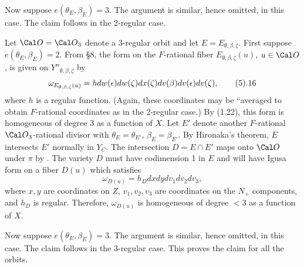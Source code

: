 Now suppose $e(\theta_E,\beta_E)=3$. The argument is similar,
hence omitted, in this case. The claim follows in the
2-regular case.

Let ${\Cal O}={\Cal O}_3$ denote a 3-regular orbit and let 
$E=E_{\emptyset, \beta,\zeta}$. 
First suppose $e(\theta_E,\beta_E)=2$.
From \S 8, the form on the $F$-rational fiber
$E_{\emptyset,\beta,\zeta}(u)$, $u\in {\Cal O}$, is given 
on $Y''_{\emptyset,\beta,\zeta}$ by
$$
\omega_{E_{\emptyset,\beta,\zeta}(u)}
=h dw(\epsilon)dw(\zeta)dx(\zeta)dv(\beta)dv(\epsilon)dv(\zeta),
\tag 5.16
$$
where $h$ is a regular function.
(Again, these coordinates may be ``averaged to obtain $F$-rational
coordinates as in the 2-regular case.)
By (1.22), this form is homogeneous
of degree 3 as a function of $X$. Let $E'$ denote another 
$F$-rational ${\Cal O}_3$-rational divisor with
$\theta_E=\theta_{E'}$, $\beta_E =\beta_{E'}$. By Hironaka's theorem,
$E$ intersects $E'$ normally in $Y_C$. The intersection $D=E\cap E'$
maps onto ${\Cal O}$ under $\pi$ by \cite{DG, chap II, Prop 3.1}. 
The variety $D$ must have codimension 1 in $E$ and will have Igusa form on 
a fiber $D(u)$ which satisfies
$$
\omega_{D(u)}=h_Ddx dy dv_1dv_2dv_3,
$$
where $x,y$ are coordinates on $Z$, $v_1,v_2,v_3$ are coordinates on the
$N_+$ components, and $h_D$ is regular. Therefore, $\omega_{D(u)}$
is homogeneous of degree $<3$ as a function of $X$. 

Now suppose $e(\theta_E,\beta_E)=3$. The argument is similar,
hence omitted, in this case. The claim follows in the
3-regular case.
This proves the claim for all the orbits. 

